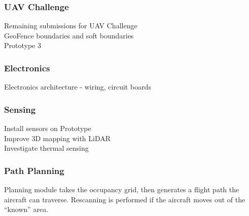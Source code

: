 \subsubsection*{UAV Challenge}
Remaining submissions for UAV Challenge\\

GeoFence boundaries and soft boundaries\\

Prototype 3\\

\subsubsection*{Electronics}
Electronics architecture - wiring, circuit boards\\

\subsubsection*{Sensing}
Install sensors on Prototype\\

Improve 3D mapping with LiDAR\\

Investigate thermal sensing\\

\subsubsection*{Path Planning}
Planning module takes the occupancy grid, then generates a flight path the aircraft can traverse. Rescanning is performed if the aircraft moves out of the ``known'' area.